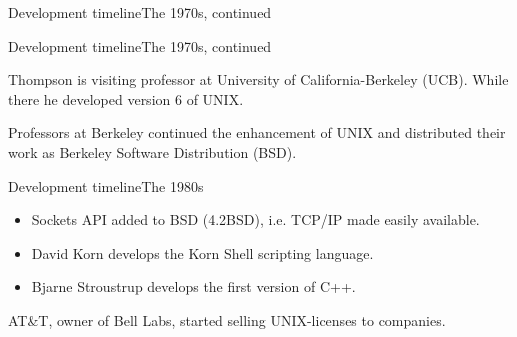 \documentclass{beamer}
\begin{document}
\begin{frame}{Development timeline}{The 1970s, continued}
	\begin{description}
	\end{description}
\end{frame}

\begin{frame}{Development timeline}{The 1970s, continued}
	\begin{description}
		\item<1>[1975] Thompson is visiting professor at University of 
			California-Berkeley (UCB).
			While there he developed version 6 of UNIX.

		\item<2>[1978] Professors at Berkeley continued the enhancement of UNIX and 
			distributed their work as Berkeley Software Distribution (BSD).

  \end{description}
\end{frame}

\begin{frame}{Development timeline}{The 1980s}
	\begin{description}
		\item<1>[1983]
			\begin{itemize}
				\item Sockets API added to BSD (4.2BSD), i.e. TCP/IP made easily 
					available.

				\item David Korn develops the Korn Shell scripting language.

				\item Bjarne Stroustrup develops the first version of C++.

			\end{itemize}

		\item<2>[1984] AT\&T, owner of Bell Labs, started selling UNIX-licenses to 
			companies.

  \end{description}
\end{frame}
\end{document}
